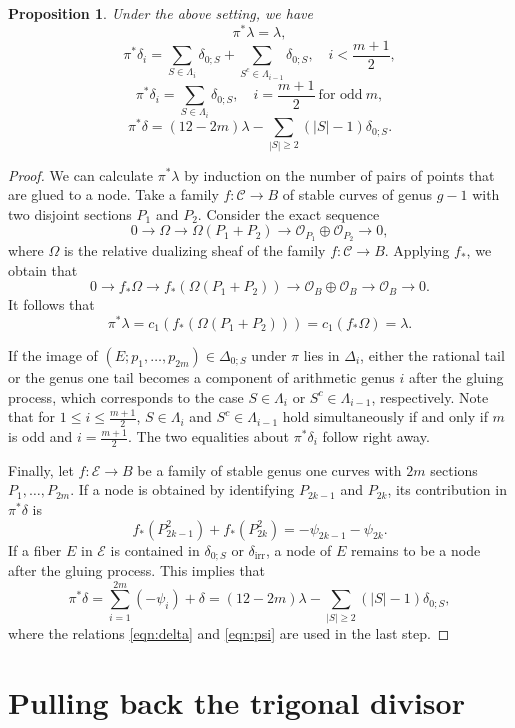 \documentclass[11]{amsart}
\theoremstyle{plain}
\newtheorem{proposition}[theorem]{Proposition}
\theoremstyle{definition}
\newcommand{\CC}{\mathcal C}
\newcommand{\EE}{\mathcal E}
\newcommand{\OO}{\mathcal O}
\newcommand{\irr}{\operatorname{irr}}
\begin{document}
\begin{proposition}
\label{prop:pullback}
Under the above setting, we have 
$$ \pi^{*}\lambda = \lambda, $$
$$ \pi^{*}\delta_i = \sum_{S\in \Lambda_i} \delta_{0; S} + \sum_{S^c\in \Lambda_{i-1}} \delta_{0; S}, \quad i <\frac{m+1}{2}, $$
$$ \pi^{*}\delta_i = \sum_{S\in \Lambda_i} \delta_{0; S}, \quad i = \frac{m+1}{2} \ \mbox{for odd}\ m, $$
$$ \pi^{*}\delta = (12 - 2m)\lambda - \sum_{|S|\geq 2} (|S| - 1)\delta_{0;S}. $$
\end{proposition}

\begin{proof}
We can calculate $\pi^{*}\lambda$ by induction on the number of pairs of points that are glued to a node. Take a family $f : \CC \to B$ of stable curves of genus $g-1$ with two disjoint sections $P_1$ and $P_2$. Consider the exact sequence 
$$ 0\to \Omega \to \Omega(P_1 + P_2) \to \OO_{P_1}\oplus \OO_{P_2} \to 0, $$
where $\Omega$ is the relative dualizing sheaf of the family $f: \CC \to B$. 
Applying $f_*$, we obtain that 
$$ 0\to f_{*}\Omega \to f_{*}(\Omega(P_1 + P_2)) \to \OO_{B}\oplus \OO_B\to \OO_B \to 0. $$
It follows that   
$$  \pi^{*}\lambda = c_1(f_{*}(\Omega(P_1 + P_2))) = c_1(f_{*}\Omega) = \lambda. $$

If the image of $(E; p_1, \ldots, p_{2m})\in \Delta_{0;S}$ under $\pi$ lies in $\Delta_i$, 
either the rational tail or the genus one tail  becomes a component of arithmetic genus $i$ after the gluing process, which corresponds to the case $S\in \Lambda_i$ or $S^c \in \Lambda_{i-1}$, respectively. Note that for $1\leq i \leq \frac{m+1}{2}$, $S\in \Lambda_i$ and $S^c \in \Lambda_{i-1}$ hold simultaneously if and only if $m$ is odd and $ i = \frac{m+1}{2}$. 
The two equalities about $\pi^{*}\delta_i$ follow right away. 

Finally, let $f: \EE\to B$ be a family of stable genus one curves with $2m$ sections $P_1, \ldots, P_{2m}$. 
If a node is obtained by identifying $P_{2k-1}$ and $P_{2k}$, its contribution in $\pi^{*}\delta$ is 
$$f_{*}(P_{2k-1}^2) + f_{*}(P_{2k}^2) = - \psi_{2k-1} - \psi_{2k}. $$
If a fiber $E$ in $\EE$ is contained in $\delta_{0;S}$ or $\delta_{\irr}$, a node of $E$ remains to be a node after the gluing process. This implies that 
$$ \pi^{*}\delta  =  \sum_{i=1}^{2m} (-\psi_i) + \delta = (12 - 2m)\lambda - \sum_{|S|\geq 2} (|S| - 1)\delta_{0;S}, $$
 where the relations \eqref{eqn:delta} and \eqref{eqn:psi} are used in the last step.  
\end{proof}


\section{Pulling back the trigonal divisor}
\label{sec:trigonal}
\end{document}
